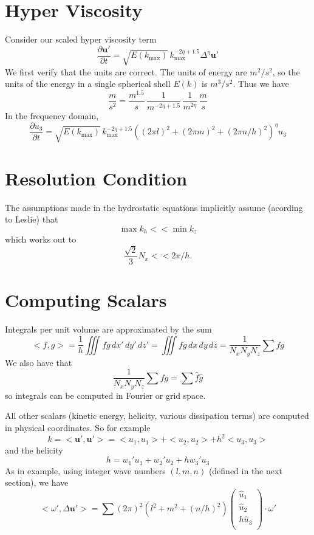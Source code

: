 \documentclass[12pt]{article}
\newcommand{\up}{\mathbf u'}
\begin{document}
\section{Hyper Viscosity}
Consider our scaled hyper viscosity term
\[
\frac{ \partial  \up }{\partial t} = 
\sqrt{E(k_\textrm{max})} \,  k_\textrm{max}^{-2\eta + 1.5}  \Delta^\eta \up
\]
We first verify that the units are correct.  The units of
energy are $m^2/s^2$, so the units of the energy in a single
spherical shell $E(k)$ is $m^3/s^2$.  Thus we have
\[
\frac{m}{s^2} = \frac{m^{1.5}}{s} \,\frac{1}{m^{-2\eta+1.5}}  
                          \,\frac{1}{m^{2\eta}}
                           \, \frac{m}{s}
\]
In the frequency domain, 
\[
\frac{ \partial  u_3 }{\partial t} = 
\sqrt{E(k_\textrm{max})} \,  k_\textrm{max}^{-2\eta + 1.5}  
( (2\pi l)^2 + (2\pi m)^2 + (2\pi n/h)^2)^\eta u_3
\]

\section{Resolution Condition}

The assumptions made in the hydrostatic equations implicitly assume
(acording to Leslie) that 
\[
 \max{ k_h } << \min{k_z}
\]
which works out to
\[
   \frac{\sqrt{2}}{3} N_x <<  2 \pi /h.
\]



\section{Computing Scalars}
Integrals per unit volume are approximated by the sum
\[
<f,g> = \frac{1}{h} \iiint  f g  \, dx' \, dy' \, dz' =   \iiint  f g \, dx \, dy \, dz
=\frac{1}{N_x N_y N_z} \sum  f  g
\]
We also have that 
\[
\frac{1}{N_x N_y N_z} \sum  f  g = \sum \hat{f} \hat{g}
\]
so integrals can be computed in Fourier or grid space. 

All other scalars (kinetic energy, helicity, various dissipation
terms) are computed in physical coordinates.  So for example
\[
k = <\up,\up> = <u_1,u_1> + <u_2,u_2> + h^2 <u_3,u_3>
\]
and the helicity 
\[
  h  = w_1' u_1  + w_2' u_2 + h w_3' u_3
\]
As in example, using integer wave numbers $(l,m,n)$ (defined in the
next section), we have
\[
< \omega' , \Delta \up> = \sum (2 \pi)^2 (l^2 + m^2 + (n/h)^2) 
\begin{pmatrix} \hat{u}_1 \\
                \hat{u}_2 \\
                h \hat{u}_3  \\
\end{pmatrix}  
 \cdot \omega'
\]
\end{document}
